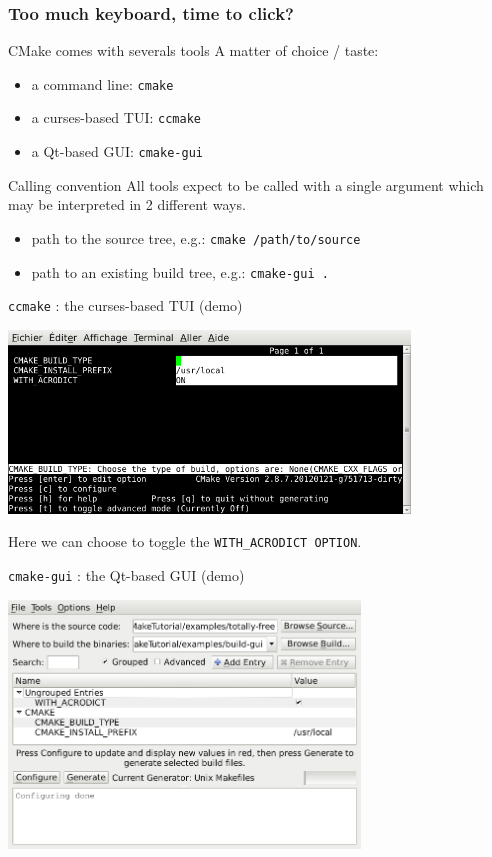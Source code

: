 \documentclass[compress,slidestop,table,usepdftitle=false
              ]
               {beamer}
\newcommand{\fname}[1]{\texttt{#1}}
\begin{document}
\begin{frame}
  \frametitle{Too much keyboard, time to click?}

\begin{block}{CMake comes with severals tools}
  A matter of choice / taste:
  \vspace*{0.4cm}
\begin{itemize}
\item a command line: \fname{cmake}
\item a curses-based TUI: \fname{ccmake}
\item a Qt-based GUI: \fname{cmake-gui}
\end{itemize}
\end{block}

\begin{alertblock}{Calling convention}
All tools expect to be called with a single argument
which may be interpreted in 2 different ways.
\vspace*{0.4cm}
\begin{itemize}
\item path to the source tree, e.g.: \fname{cmake /path/to/source}
\item path to an \alert{existing} build tree, e.g.: \fname{cmake-gui .}
\end{itemize}
\end{alertblock}

\begin{center}
\fname{ccmake} : the curses-based TUI (demo)

\includegraphics[width=0.8\textwidth]{ccmake-1}

Here we can choose to toggle the \lstinline!WITH_ACRODICT OPTION!.
\end{center}

\begin{center}
\fname{cmake-gui} : the Qt-based GUI (demo)

\includegraphics[width=0.7\textwidth]{cmake-gui-1}


\end{center}
\end{frame}
\end{document}
